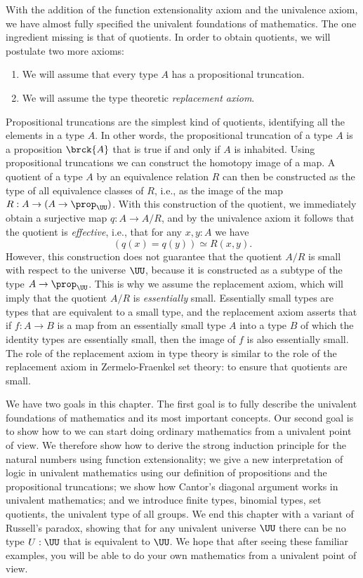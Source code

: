 With the addition of the function extensionality axiom and the univalence axiom, we have almost fully specified the univalent foundations of mathematics. The one ingredient missing is that of quotients. In order to obtain quotients, we will postulate two more axioms:
\begin{enumerate}
  \addtocounter{enumi}{2}
\item We will assume that every type $A$ has a propositional truncation.
\item We will assume the type theoretic \emph{replacement axiom}. 
\end{enumerate}

Propositional truncations are the simplest kind of quotients, identifying all the elements in a type $A$. In other words, the propositional truncation of a type $A$ is a proposition $\brck{A}$ that is true if and only if $A$ is inhabited. Using propositional truncations we can construct the homotopy image of a map. A quotient of a type $A$ by an equivalence relation $R$ can then be constructed as the type of all equivalence classes of $R$, i.e., as the image of the map $R:A\to (A\to \prop_\UU)$. With this construction of the quotient, we immediately obtain a surjective map $q:A\to A/R$, and by the univalence axiom it follows that the quotient is \emph{effective}, i.e., that for any $x,y:A$ we have
\begin{equation*}
  (q(x)=q(y))\simeq R(x,y).
\end{equation*}
However, this construction does not guarantee that the quotient $A/R$ is small with respect to the universe $\UU$, because it is constructed as a subtype of the type $A\to\prop_\UU$. This is why we assume the replacement axiom, which will imply that the quotient $A/R$ is \emph{essentially} small. Essentially small types are types that are equivalent to a small type, and the replacement axiom asserts that if $f:A\to B$ is a map from an essentially small type $A$ into a type $B$ of which the identity types are essentially small, then the image of $f$ is also essentially small. The role of the replacement axiom in type theory is similar to the role of the replacement axiom in Zermelo-Fraenkel set theory: to ensure that quotients are small.

We have two goals in this chapter. The first goal is to fully describe the univalent foundations of mathematics and its most important concepts. Our second goal is to show how to we can start doing ordinary mathematics from a univalent point of view. We therefore show how to derive the strong induction principle for the natural numbers using function extensionality; we give a new interpretation of logic in univalent mathematics using our definition of propositions and the propositional truncations; we show how Cantor's diagonal argument works in univalent mathematics; and we introduce finite types, binomial types, set quotients, the univalent type of all groups. We end this chapter with a variant of Russell's paradox, showing that for any univalent universe $\UU$ there can be no type $U:\UU$ that is equivalent to $\UU$. We hope that after seeing these familiar examples, you will be able to do your own mathematics from a univalent point of view.

